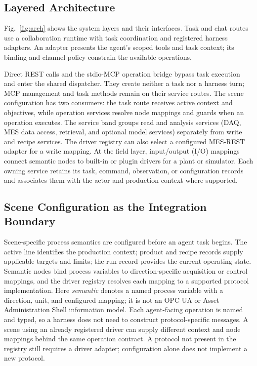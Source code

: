 \subsection{Layered Architecture}
\label{sec:layers}
Fig.~\ref{fig:arch} shows the system layers and their interfaces. Task and
chat routes use a collaboration runtime with task coordination and registered
harness adapters. An adapter presents the agent's scoped tools and task context;
its binding and channel policy constrain the available operations.

Direct REST calls and the stdio-MCP operation bridge bypass task execution
and enter the shared dispatcher. They create neither a task nor a harness
turn; MCP management and task methods remain on their service routes. The
scene configuration has two consumers: the task route receives active context
and objectives, while operation services resolve node mappings and guards
when an operation executes. The service band groups read and analysis services (DAQ, MES data access,
retrieval, and optional model services) separately from write and recipe
services. The driver registry can also select a configured MES-REST adapter
for a write mapping. At the field layer, input/output (I/O) mappings connect
semantic nodes to built-in or plugin drivers for a plant or simulator. Each
owning service retains its task, command, observation, or configuration
records and associates them with the actor and production context where
supported.

\subsection{Scene Configuration as the Integration Boundary}
\label{sec:scene-config}
Scene-specific process semantics are configured before an
agent task begins. The active line identifies the production context; product
and recipe records supply applicable targets and limits; the run record
provides the current operating state. Semantic nodes bind process variables
to direction-specific acquisition or control mappings, and the driver
registry resolves each mapping to a supported protocol implementation. Here
\emph{semantic} denotes a named process variable with a direction, unit, and
configured mapping; it is not an OPC UA or Asset Administration Shell
information model. Each agent-facing operation is named and typed, so a harness does not need to
construct protocol-specific messages. A scene using an already registered
driver can supply different context and node mappings behind the same
operation contract. A protocol not present in the registry still requires a
driver adapter; configuration alone does not implement a new protocol.

